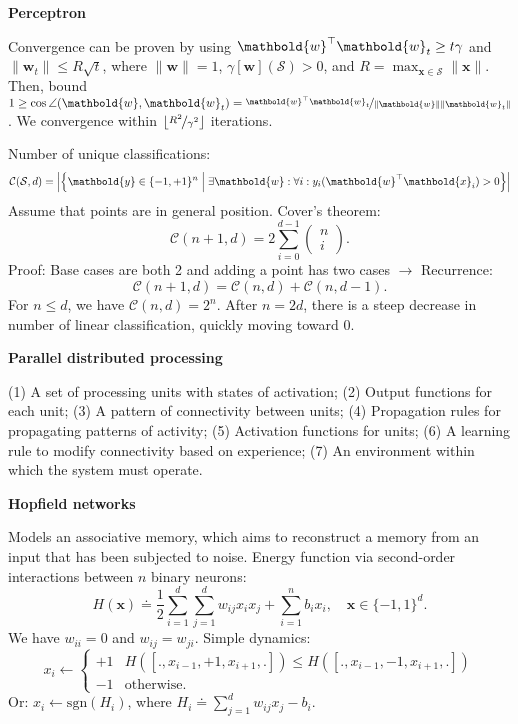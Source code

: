 \documentclass[10pt]{article}
\newenvironment{topic}[1]
{\textbf{\sffamily \footnotesize \colorbox{black}{\rlap{\textbf{\textcolor{white}{#1}}}\hspace{\linewidth}\hspace{-2\fboxsep}}}}
{}
\newenvironment{subtopic}[1]
{\vspace{0.1cm} \begin{center}\textbf{\footnotesize \sffamily #1}\end{center}}
{}
\renewcommand{\vec}[1]{\ensuremath{\mathbold{#1}}}
\begin{document}
\begin{multicols*}{3}
\begin{topic}{Connectionism}
\begin{subtopic}{Perceptron}
            Convergence can be proven by using $\transpose{\vec{w}} \vec{w}_t \geq t \gamma$ and $\| \vec{w}_t
                \| \leq R \sqrt{t}$, where $\| \vec{w} \| = 1$, $\gamma[\vec{w}](\mathcal{S}) > 0$, and $R =
                \max_{\vec{x} \in \mathcal{S}} \| \vec{x} \|$. Then, bound $1 \geq \cos\angle{(\vec{w},\vec{w}_t)}
                = \nicefrac{\transpose{\vec{w}} \vec{w}_t}{\| \vec{w} \| \| \vec{w}_t \|}$. We convergence within
            $\lfloor \nicefrac{R^2}{\gamma^2} \rfloor$ iterations.

            Number of unique classifications: \[
                \mathcal{C}(\mathcal{S},d) = \lft| \lft\{ \vec{y} \in \{ -1,+1 \}^n \;\middle|\; \exists \vec{w} : \forall i : y_i (\transpose{\vec{w}}\vec{x}_i) > 0 \rgt\} \rgt|
            \]
            Assume that points are in general position. Cover's theorem: \[
                \mathcal{C}(n+1,d) = 2 \sum_{i=0}^{d-1} \begin{pmatrix} n \\ i \end{pmatrix}.
            \]
            Proof: Base cases are both 2 and adding a point has two cases $\to$ Recurrence: \[
                \mathcal{C}(n+1,d) = \mathcal{C}(n,d) + \mathcal{C}(n,d-1).
            \]
            For $n \leq d$, we have $\mathcal{C}(n,d) = 2^n$. After $n=2d$, there is a steep decrease in number
            of linear classification, quickly moving toward $0$.
        \end{subtopic}

        \begin{subtopic}{Parallel distributed processing}
            (1) A set of processing units with states of activation; (2) Output functions for each
            unit; (3) A pattern of connectivity between units; (4) Propagation rules for propagating
            patterns of activity; (5) Activation functions for units; (6) A learning rule to modify
            connectivity based on experience; (7) An environment within which the system must operate.
        \end{subtopic}

        \begin{subtopic}{Hopfield networks}
            Models an associative memory, which aims to reconstruct a memory from an input that has been subjected to noise. Energy function via second-order interactions between $n$ binary neurons: \[
                H(\vec{x}) \doteq \frac{1}{2} \sum_{i=1}^{d} \sum_{j=1}^{d} w_{ij}x_ix_j + \sum_{i=1}^{n} b_ix_i, \quad \vec{x} \in \{ -1, 1 \}^d.
            \]
            We have $w_{ii} = 0$ and $w_{ij} = w_{ji}$. Simple dynamics: \[
                x_i \gets \begin{cases}
                    +1 & H([., x_{i-1}, +1, x_{i+1}, .]) \leq H([., x_{i-1}, -1, x_{i+1}, .]) \\
                    -1 & \mathrm{otherwise}.
                \end{cases}
            \]
            Or: $x_i \gets \mathrm{sgn}(H_i)$, where $H_i \doteq \sum_{j=1}^{d} w_{ij} x_j - b_i$.


\end{subtopic}
\end{topic}
\end{multicols*}
\end{document}

